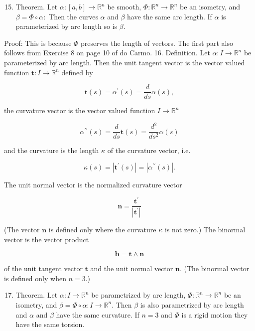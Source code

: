 \documentclass[10pt]{article}
\begin{document}
\begin{enumerate}
  \setcounter{enumi}{14}
  \item Theorem. Let $\alpha:[a, b] \rightarrow \mathbb{R}^{n}$ be smooth, $\Phi: \mathbb{R}^{n} \rightarrow \mathbb{R}^{n}$ be an isometry, and $\beta=\Phi \circ \alpha:$ Then the curves $\alpha$ and $\beta$ have the same arc length. If $\alpha$ is parameterized by arc length so is $\beta$.
\end{enumerate}

Proof: This is because $\Phi$ preserves the length of vectors. The first part also follows from Exercise 8 on page 10 of do Carmo. 16. Definition. Let $\alpha: I \rightarrow \mathbb{R}^{n}$ be parameterized by arc length. Then the unit tangent vector is the vector valued function $\mathbf{t}: I \rightarrow \mathbb{R}^{n}$ defined by

$$
\mathbf{t}(s)=\alpha^{\prime}(s)=\frac{d}{d s} \alpha(s),
$$

the curvature vector is the vector valued function $I \rightarrow \mathbb{R}^{n}$

$$
\alpha^{\prime \prime}(s)=\frac{d}{d s} \mathbf{t}(s)=\frac{d^{2}}{d s^{2}} \alpha(s)
$$

and the curvature is the length $\kappa$ of the curvature vector, i.e.

$$
\kappa(s)=\left|\mathbf{t}^{\prime}(s)\right|=\left|\alpha^{\prime \prime}(s)\right| .
$$

The unit normal vector is the normalized curvature vector

$$
\mathbf{n}=\frac{\mathbf{t}^{\prime}}{\left|\mathbf{t}^{\prime}\right|}
$$

(The vector $\mathbf{n}$ is defined only where the curvature $\kappa$ is not zero.) The binormal vector is the vector product

$$
\mathbf{b}=\mathbf{t} \wedge \mathbf{n}
$$

of the unit tangent vector $\mathbf{t}$ and the unit normal vector $\mathbf{n}$. (The binormal vector is defined only when $n=3$.)

\begin{enumerate}
  \setcounter{enumi}{16}
  \item Theorem. Let $\alpha: I \rightarrow \mathbb{R}^{n}$ be parametrized by arc length, $\Phi: \mathbb{R}^{n} \rightarrow \mathbb{R}^{n}$ be an isometry, and $\beta=\Phi \circ \alpha: I \rightarrow \mathbb{R}^{n}$. Then $\beta$ is also parametrized by arc length and $\alpha$ and $\beta$ have the same curvature. If $n=3$ and $\Phi$ is a rigid motion they have the same torsion.
\end{enumerate}
\end{document}
